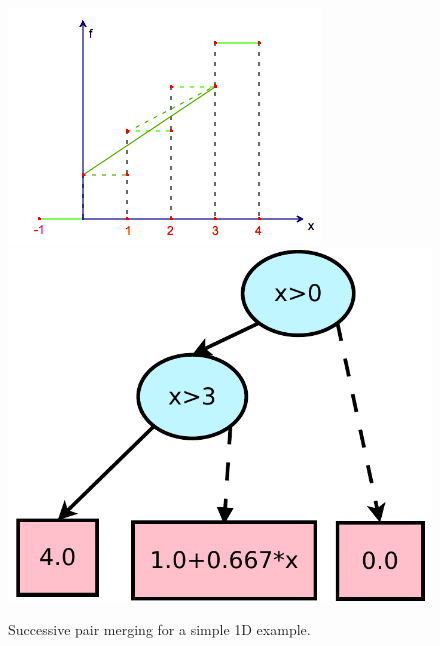 \begin{figure}[t!]
{\begin{minipage}{.25\textwidth}
	 \includegraphics[width=\textwidth]{Figures/stepfun/succ3.png}
	\end{minipage}
	\begin{minipage}{.2\textwidth}
	\includegraphics[width=\textwidth]{Figures/xadds/succ3.pdf}
	\end{minipage}
	 \label{step2}
}
\caption{ \footnotesize Successive pair merging for a simple 1D example.}
 \label{fig:steplining}
\end{figure}

